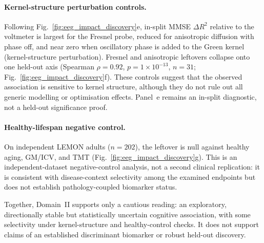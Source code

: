 \documentclass[twocolumn, 10pt]{article}
\begin{document}
\paragraph{Kernel-structure perturbation controls.}
Following Fig.~\ref{fig:eeg_impact_discovery}e, in-split MMSE \(\Delta R^{2}\) relative to the voltmeter is largest for the Fresnel probe, reduced for anisotropic diffusion with phase off, and near zero when oscillatory phase is added to the Green kernel (kernel-structure perturbation). Fresnel and anisotropic leftovers collapse onto one held-out axis (Spearman \(\rho=0.92\), \(p=1\times10^{-13}\), \(n=31\); Fig.~\ref{fig:eeg_impact_discovery}f). These controls suggest that the observed association is sensitive to kernel structure, although they do not rule out all generic modelling or optimisation effects\cite{vinuesa2023,sharma2025}. Panel~e remains an in-split diagnostic, not a held-out significance proof.

\paragraph{Healthy-lifespan negative control.}
On independent LEMON adults (\(n=202\)), the leftover is null against healthy aging, GM/ICV, and TMT (Fig.~\ref{fig:eeg_impact_discovery}g). This is an independent-dataset negative-control analysis, not a second clinical replication: it is consistent with disease-context selectivity among the examined endpoints but does not establish pathology-coupled biomarker status.

Together, Domain~II supports only a cautious reading: an exploratory, directionally stable but statistically uncertain cognitive association, with some selectivity under kernel-structure and healthy-control checks. It does not support claims of an established discriminant biomarker or robust held-out discovery.
\end{document}
